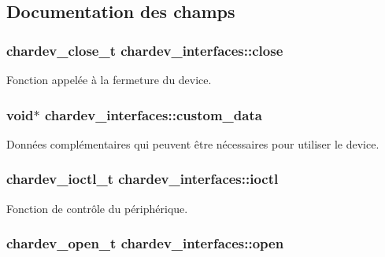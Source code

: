 \subsection{Documentation des champs}
\hypertarget{structchardev__interfaces_a9cba421c4dddc041e4b5029d011dbbd9}{
\subsubsection[{close}]{\setlength{\rightskip}{0pt plus 5cm}chardev\-\_\-close\-\_\-t chardev\-\_\-interfaces\-::close}}\label{structchardev__interfaces_a9cba421c4dddc041e4b5029d011dbbd9}
Fonction appelée à la fermeture du device. \hypertarget{structchardev__interfaces_a9b6b938d76fe7e20c93da8a032a42ad7}{
\subsubsection[{custom\-\_\-data}]{\setlength{\rightskip}{0pt plus 5cm}void$\ast$ chardev\-\_\-interfaces\-::custom\-\_\-data}}\label{structchardev__interfaces_a9b6b938d76fe7e20c93da8a032a42ad7}
Données complémentaires qui peuvent être nécessaires pour utiliser le device. \hypertarget{structchardev__interfaces_a9e5903e31e8e5ab21e9abc4b3a844e4a}{
\subsubsection[{ioctl}]{\setlength{\rightskip}{0pt plus 5cm}chardev\-\_\-ioctl\-\_\-t chardev\-\_\-interfaces\-::ioctl}}\label{structchardev__interfaces_a9e5903e31e8e5ab21e9abc4b3a844e4a}
Fonction de contrôle du périphérique. \hypertarget{structchardev__interfaces_a7962a67531ea5263a2f837c36fb18dc0}{
\subsubsection[{open}]{\setlength{\rightskip}{0pt plus 5cm}chardev\-\_\-open\-\_\-t chardev\-\_\-interfaces\-::open}}\label{structchardev__interfaces_a7962a67531ea5263a2f837c36fb18dc0}
